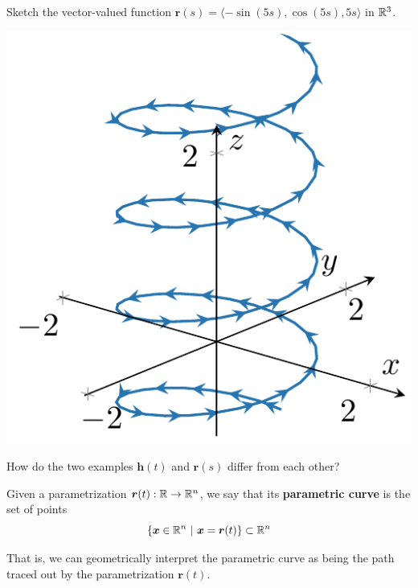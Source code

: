 \begin{example}\label{helix2}
Sketch the vector-valued function $\bm{r}(s) = \langle -\sin(5s), \cos(5s), 5s \rangle$ in $\mathbb{R}^3$.

 \begin{center}        
        \includegraphics[scale=.75]{chapters/2-RealAnalysis/figures/figures-helix5x.pdf}
    \end{center}

\end{example}

\begin{motivating}
How do the two examples \hyperref[helix1]{$\bm{h}(t)$} and \hyperref[helix2]{$\bm{r}(s)$} differ from each other?
\end{motivating}

\begin{definition}

    Given a parametrization $\bm{r}(t) : \mathbb{R} \to \mathbb{R}^n$, we say that its \textbf{parametric curve} is the set of points $$\{\bm{x} \in \R^n \ | \ \bm{x} = \bm{r}(t)\} \subset \R^n$$
    
\end{definition}

That is, we can geometrically interpret the parametric curve as being the path traced out by the parametrization $\bm{r}(t)$.  

